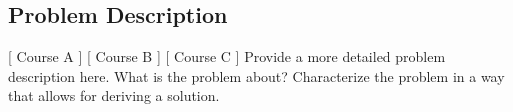 \subsection{Problem Description}
[ Course A ] [ Course B ] [ Course C ] 
\newline
[ Author A] [ Author B ] [ Author C ] 
\newline
Provide a more detailed problem description here. What is the problem about? Characterize the problem in a way that allows for deriving a solution.
